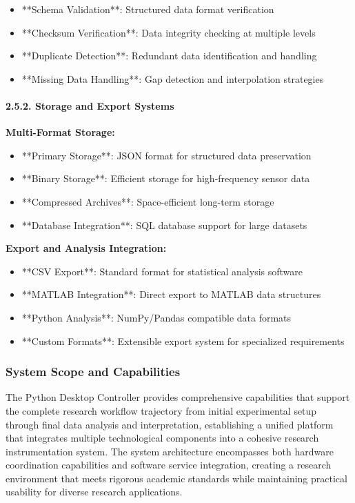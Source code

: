 \documentclass[11pt,a4paper]{article}
\begin{document}
\begin{itemize}
\item **Schema Validation**: Structured data format verification
\item **Checksum Verification**: Data integrity checking at multiple levels
\item **Duplicate Detection**: Redundant data identification and handling
\item **Missing Data Handling**: Gap detection and interpolation strategies

\end{itemize}
\paragraph{2.5.2. Storage and Export Systems}

\textbf{Multi-Format Storage:}

\begin{itemize}
\item **Primary Storage**: JSON format for structured data preservation
\item **Binary Storage**: Efficient storage for high-frequency sensor data
\item **Compressed Archives**: Space-efficient long-term storage
\item **Database Integration**: SQL database support for large datasets

\end{itemize}
\textbf{Export and Analysis Integration:}

\begin{itemize}
\item **CSV Export**: Standard format for statistical analysis software
\item **MATLAB Integration**: Direct export to MATLAB data structures
\item **Python Analysis**: NumPy/Pandas compatible data formats
\item **Custom Formats**: Extensible export system for specialized requirements

\end{itemize}
\subsubsection{System Scope and Capabilities}

The Python Desktop Controller provides comprehensive capabilities that support the complete research workflow trajectory
from initial experimental setup through final data analysis and interpretation, establishing a unified platform that
integrates multiple technological components into a cohesive research instrumentation system. The system architecture
encompasses both hardware coordination capabilities and software service integration, creating a research environment
that meets rigorous academic standards while maintaining practical usability for diverse research applications.
\end{document}
